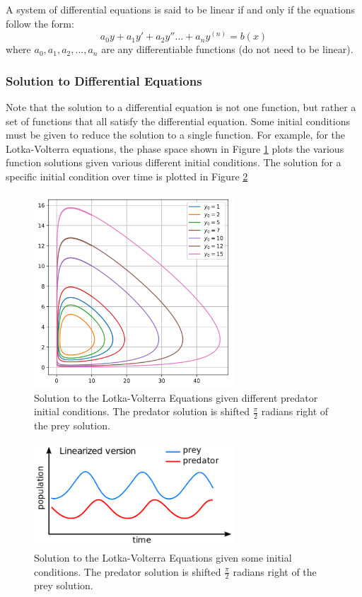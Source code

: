 \begin{definition}
    A system of differential equations is said to be linear if and only if the equations follow the form:
    \[ a_0 y + a_1 y' + a_2 y'' \dots + a_n y^{(n)} = b(x) \]
    \noindent
    where $a_0, a_1, a_2, ..., a_n$ are any differentiable functions (do not need to be linear).
\end{definition}

\subsubsection{Solution to Differential Equations}
Note that the solution to a differential equation is not one function, but rather a set of functions that all satisfy the differential equation. Some initial conditions must be given to reduce the solution to a single function. For example, for the Lotka-Volterra equations, the phase space shown in Figure \ref{fig:lotka_volterra_phase} plots the various function solutions given various different initial conditions. The solution for a specific initial condition over time is plotted in Figure \ref{fig:lotka_volterra_init}

\begin{figure}[H]
    \centering
    \includegraphics[width=75mm,height=\textheight,keepaspectratio]{images/Predator_prey_dynamics.png}
    \caption{Solution to the Lotka-Volterra Equations given different predator initial conditions. The predator solution is shifted $\frac{\pi}{2}$ radians right of the prey solution.}
    \label{fig:lotka_volterra_phase}
\end{figure}

\begin{figure}[H]
    \centering
    \includegraphics[width=75mm,height=\textheight,keepaspectratio]{images/Lotka_Volterra_dynamics.png}
    \caption{Solution to the Lotka-Volterra Equations given some initial conditions. The predator solution is shifted $\frac{\pi}{2}$ radians right of the prey solution.}
    \label{fig:lotka_volterra_init}
\end{figure}

